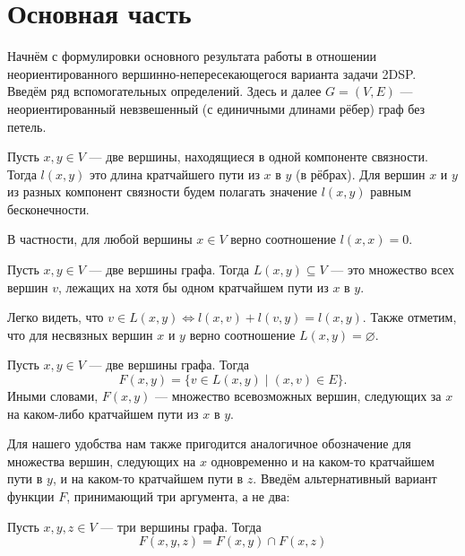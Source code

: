 \chapter{Основная часть}
\label{cha:main}

Начнём с формулировки основного результата работы \cite{ET} в отношении неориентированного вершинно-непересекающегося варианта задачи 2DSP. Введём ряд вспомогательных определений. Здесь и далее $G = (V, E)$ --- неориентированный невзвешенный (с единичными длинами рёбер) граф без петель.

\begin{definition} 
Пусть $x, y \in V$ --- две вершины, находящиеся в одной компоненте связности. Тогда $l(x, y)$ это длина кратчайшего пути из $x$ в $y$ (в рёбрах). Для вершин $x$ и $y$ из разных компонент связности будем полагать значение $l(x, y)$ равным бесконечности.
\end{definition}

В частности, для любой вершины $x \in V$ верно соотношение $l(x, x) = 0$.

\begin{definition} 
Пусть $x, y \in V$ --- две вершины графа. Тогда $L(x, y) \subseteq V$ --- это множество всех вершин $v$, лежащих на хотя бы одном кратчайшем пути из $x$ в $y$.
\end{definition}

Легко видеть, что $v \in L(x, y) \Leftrightarrow l(x, v) + l(v, y) = l(x, y)$. Также отметим, что для несвязных вершин $x$ и $y$ верно соотношение $L(x, y) = \varnothing$.

\begin{definition}
Пусть $x, y \in V$ --- две вершины графа. Тогда 
\begin{equation}
F(x, y) = \{v \in L(x, y) \mid (x, v) \in E\}.
\end{equation}
Иными словами, $F(x, y)$ --- множество всевозможных вершин, следующих за $x$ на каком-либо кратчайшем пути из $x$ в $y$. 
\end{definition}

Для нашего удобства нам также пригодится аналогичное обозначение для множества вершин, следующих на $x$ одновременно и на каком-то кратчайшем пути в $y$, и на каком-то кратчайшем пути в $z$. Введём альтернативный вариант функции $F$, принимающий три аргумента, а не два:

\begin{definition}
Пусть $x, y, z \in V$ --- три вершины графа. Тогда
\begin{equation}
F(x, y, z) = F(x, y) \cap F(x, z)
\end{equation}
\end{definition}

